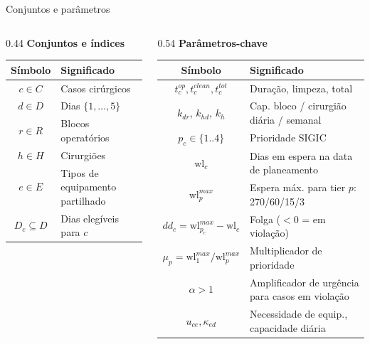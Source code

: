 \documentclass[10pt,aspectratio=169]{beamer}
\begin{document}
\begin{frame}{Conjuntos e par\^ametros}
  \begin{columns}
    \begin{column}{0.44\textwidth}
      \textbf{Conjuntos e \'indices}\vspace{0.2em}
      \begin{center}\footnotesize
      \begin{tabular}{cl}
        \toprule
        S\'imbolo & Significado \\
        \midrule
        $c\in C$ & Casos cir\'urgicos \\
        $d\in D$ & Dias $\{1,\dots,5\}$ \\
        $r\in R$ & Blocos operat\'orios \\
        $h\in H$ & Cirurgi\~oes \\
        $e\in E$ & Tipos de equipamento partilhado \\
        $D_c\subseteq D$ & Dias eleg\'iveis para $c$ \\
        \bottomrule
      \end{tabular}
      \end{center}
    \end{column}
    \begin{column}{0.54\textwidth}
      \textbf{Par\^ametros-chave}\vspace{0.2em}
      \begin{center}\footnotesize
      \begin{tabular}{cl}
        \toprule
        S\'imbolo & Significado \\
        \midrule
        $t_c^{op},t_c^{clean},t_c^{tot}$ & Dura\c{c}\~ao, limpeza, total \\
        $k_{dr}$, $k_{hd}$, $k_h$ & Cap. bloco / cirurgi\~ao di\'aria / semanal \\
        $p_c\in\{1..4\}$ & Prioridade SIGIC \\
        $\text{wl}_c$ & Dias em espera na data de planeamento \\
        $\text{wl}^{max}_p$ & Espera m\'ax. para tier $p$: 270/60/15/3 \\
        $dd_c = \text{wl}^{max}_{p_c}-\text{wl}_c$ & Folga ($<0$ = em viola\c{c}\~ao) \\
        $\mu_p = \text{wl}^{max}_1/\text{wl}^{max}_p$ & Multiplicador de prioridade \\
        $\alpha>1$ & Amplificador de urg\^encia para casos em viola\c{c}\~ao \\
        $u_{ce},\kappa_{ed}$ & Necessidade de equip., capacidade di\'aria \\

\end{tabular}
\end{center}
\end{column}
\end{columns}
\end{frame}
\end{document}
